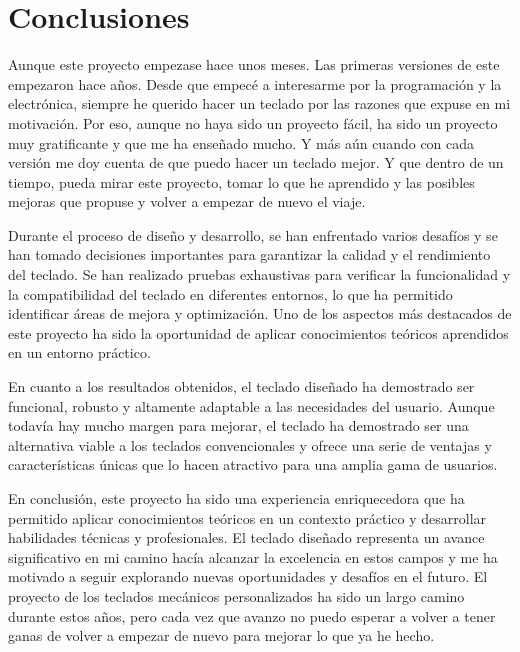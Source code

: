 \chapter{Conclusiones}

Aunque este proyecto empezase hace unos meses. Las primeras versiones de este empezaron hace años. Desde que empecé a interesarme por la programación y la electrónica, siempre he querido hacer un teclado por las razones que expuse en mi motivación. Por eso, aunque no haya sido un proyecto fácil, ha sido un proyecto muy gratificante y que me ha enseñado mucho. Y más aún cuando con cada versión me doy cuenta de que puedo hacer un teclado mejor. Y que dentro de un tiempo, pueda mirar este proyecto, tomar lo que he aprendido y las posibles mejoras que propuse y volver a empezar de nuevo el viaje.

Durante el proceso de diseño y desarrollo, se han enfrentado varios desafíos y se han tomado decisiones importantes para garantizar la calidad y el rendimiento del teclado. Se han realizado pruebas exhaustivas para verificar la funcionalidad y la compatibilidad del teclado en diferentes entornos, lo que ha permitido identificar áreas de mejora y optimización. Uno de los aspectos más destacados de este proyecto ha sido la oportunidad de aplicar conocimientos teóricos aprendidos en un entorno práctico.

En cuanto a los resultados obtenidos, el teclado diseñado ha demostrado ser funcional, robusto y altamente adaptable a las necesidades del usuario. Aunque todavía hay mucho margen para mejorar, el teclado ha demostrado ser una alternativa viable a los teclados convencionales y ofrece una serie de ventajas y características únicas que lo hacen atractivo para una amplia gama de usuarios.

En conclusión, este proyecto ha sido una experiencia enriquecedora que ha permitido aplicar conocimientos teóricos en un contexto práctico y desarrollar habilidades técnicas y profesionales. El teclado diseñado representa un avance significativo en mi camino hacía alcanzar la excelencia en estos campos y me ha motivado a seguir explorando nuevas oportunidades y desafíos en el futuro. El proyecto de los teclados mecánicos personalizados ha sido un largo camino durante estos años, pero cada vez que avanzo no puedo esperar a volver a tener ganas de volver a empezar de nuevo para mejorar lo que ya he hecho.

